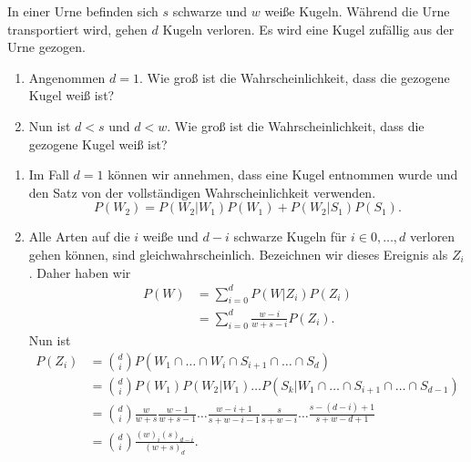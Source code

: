  In einer Urne befinden
sich $s$ schwarze und $w$ weiße Kugeln. Während die Urne transportiert wird,
gehen $d$ Kugeln verloren. Es wird eine Kugel zufällig aus der Urne gezogen.
\begin{enumerate}
    \item Angenommen $d=1$. Wie groß ist die Wahrscheinlichkeit, dass die
        gezogene Kugel weiß ist?
    \item Nun ist $d<s$ und $d<w$. Wie groß ist die Wahrscheinlichkeit, dass die
        gezogene Kugel weiß ist?
\end{enumerate}

\solution
\begin{enumerate}
    \item Im Fall $d=1$ können wir annehmen, dass eine Kugel entnommen wurde und
        den Satz von der vollständigen Wahrscheinlichkeit verwenden. 
        \begin{equation*}
            P(W_2) = P(W_2 | W_1 ) P(W_1 ) + P(W_2 | S_1) P(S_1).
        \end{equation*}

    \item Alle Arten auf die $i$ weiße und $d-i$ schwarze Kugeln für $i\in
        {0,\dots, d}$ verloren gehen können, sind gleichwahrscheinlich.
        Bezeichnen wir dieses Ereignis als $Z_i$.  Daher haben wir
        \begin{align*}
            P(W) &= \sum_{i=0}^{d} P(W | Z_i ) P(Z_i) \\
            &= \sum_{i=0}^{d} \frac{ w -i}{w+s-i} P(Z_i).
        \end{align*}
        Nun ist 
        \begin{align*}
            P(Z_i) &= \binom{d}{i} P( W_1\cap \dots\cap W_i\cap S_{i+1}\cap \dots\cap S_d ) \\
            &= \binom{d}{i} P(W_1) P(W_2 | W_1) \dots P( S_k | W_1\cap \dots\cap S_{i+1}\cap \dots\cap S_{d-1}) \\
            &= \binom{d}{i} \frac{w}{w+s}\frac{w-1}{w+s-1}\dots \frac{w-i+1}{s+w-i-1}
            \frac{s}{s+w-i}\dots\frac{s-(d-i)+1}{s+w -d+1} \\
            &= \binom{d}{i} \frac{ (w)_{i} (s)_{d-i} }{ (w+s)_{d}}.
        \end{align*}
\end{enumerate}




